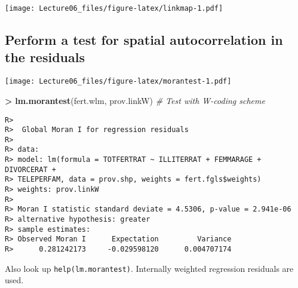 \documentclass[
]{article}
\newenvironment{Shaded}{\begin{snugshade}}{\end{snugshade}}
\newcommand{\CommentTok}[1]{\textcolor[rgb]{0.56,0.35,0.01}{\textit{#1}}}
\newcommand{\DataTypeTok}[1]{\textcolor[rgb]{0.13,0.29,0.53}{#1}}
\newcommand{\KeywordTok}[1]{\textcolor[rgb]{0.13,0.29,0.53}{\textbf{#1}}}
\newcommand{\NormalTok}[1]{#1}
\newcommand{\OperatorTok}[1]{\textcolor[rgb]{0.81,0.36,0.00}{\textbf{#1}}}
\newcommand{\StringTok}[1]{\textcolor[rgb]{0.31,0.60,0.02}{#1}}
\begin{document}
\texttt{[image: Lecture06\_files/figure-latex/linkmap-1.pdf]}

\hypertarget{perform-a-test-for-spatial-autocorrelation-in-the-residuals}{%
\subsection{Perform a test for spatial autocorrelation in the
residuals}\label{perform-a-test-for-spatial-autocorrelation-in-the-residuals}}

\begin{Shaded}
\end{Shaded}

\texttt{[image: Lecture06\_files/figure-latex/morantest-1.pdf]}

\begin{Shaded}
\begin{Highlighting}[]
\OperatorTok{>}\StringTok{ }\KeywordTok{lm.morantest}\NormalTok{(fert.wlm, prov.linkW)                             }\CommentTok{# Test with W-coding scheme}
\end{Highlighting}
\end{Shaded}

\begin{verbatim}
R> 
R>  Global Moran I for regression residuals
R> 
R> data:  
R> model: lm(formula = TOTFERTRAT ~ ILLITERRAT + FEMMARAGE + DIVORCERAT +
R> TELEPERFAM, data = prov.shp, weights = fert.fgls$weights)
R> weights: prov.linkW
R> 
R> Moran I statistic standard deviate = 4.5306, p-value = 2.941e-06
R> alternative hypothesis: greater
R> sample estimates:
R> Observed Moran I      Expectation         Variance 
R>      0.281242173     -0.029598120      0.004707174
\end{verbatim}

Also look up \texttt{help(lm.morantest)}. Internally weighted regression
residuals are used.
\end{document}
